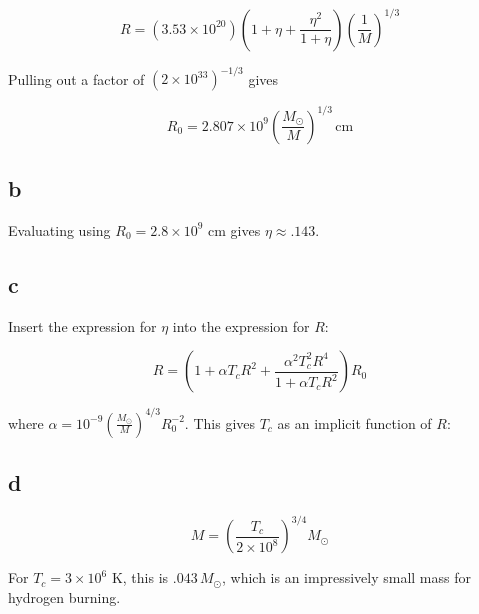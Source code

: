 \documentclass[12pt]{article}
\newcommand{\pfrac}[2]{\left(\frac{#1}{#2} \right)}
\begin{document}
\[ R = (3.53 \times 10^{20})\left( 1 + \eta + \frac{\eta^2}{1+\eta}\right) \pfrac{1}{M}^{1/3}
\]

Pulling out a factor of \((2\times 10^{33})^{-1/3}\) gives

\[ R_0 = 2.807 \times 10^ {9} \pfrac{M_{\odot}}{M}^{1/3} \, \mathrm{cm}
\] 


\subsection*{b}


Evaluating using \(R_0 = 2.8 \times 10^9\) cm gives \(\eta \approx .143\).


\subsection*{c}

Insert the expression for \(\eta\) into the expression for \(R\):

\[ R = \left( 1 + \alpha T_c R^2 + \frac{\alpha^2 T_c^2 R^4}{1+\alpha T_c R^2}\right)R_0
\]

where \(\alpha = 10^{-9}\pfrac{M_{\odot}}{M}^{4/3}R_0^{-2}\). This gives \(T_c\) as an implicit function of \(R\):



\subsection*{d}

\[ M = \pfrac{T_c}{2\times 10^{8}}^{3/4}M_{\odot}
\]

For \(T_c = 3 \times 10^6\) K, this is \(.043\,M_{\odot}\), which is an impressively small mass for hydrogen burning.
\end{document}
